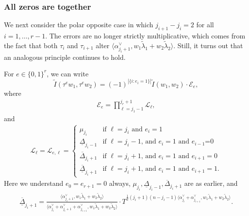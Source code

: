 \documentclass[11pt]{amsart}
\numberwithin{theorem}{section}
\numberwithin{equation}{section}
\theoremstyle{remark}
\theoremstyle{definition}
\begin{document}
\subsubsection{All zeros are together}

We next consider the polar opposite case in which $j_{i+1}-j_i=2$ for all $i=1,\ldots,r-1$. The errors are no longer strictly multiplicative, which comes from the fact that both $\tau_i$ and $\tau_{i+1}$ alter $\langle \alpha^\vee_{j_i+1},w_1\tilde\lambda_1+w_2\tilde\lambda_2\rangle$. Still, it turns out that an analogous principle continues to hold.

For $e \in \{0,1\}^r$, we can write
\begin{equation*}
\tilde I(\tau^ew_1,\tau^ew_2) = (-1)^{|\{i:e_i=1\}|} \tilde I(w_1,w_2) \cdot \mathcal E_e,
\end{equation*}
where
\begin{align*}
\mathcal E_e = \prod_{\ell=j_1-1}^{j_r+1} \mathcal L_\ell,
\end{align*} 
and
\begin{align*}
\mathcal L_\ell = \mathcal L_{e,\ell} = \begin{cases}
\mu_{j_i} & \mbox{if $\ell = j_i$ and $e_i=1$} \\
\underline{\Delta}_{j_i-1} & \mbox{if $\ell = j_i-1$, and $e_i=1$ and $e_{i-1}$=0} \\
\overline {\Delta}_{j_i+1} & \mbox{if $\ell = j_i+1$, and $e_i=1$ and $e_{i+1} = 0$} \\
\underline{\overline{\Delta}}_{j_i+1} & \mbox{if $\ell = j_i+1$, and $e_i=1$ and $e_{i+1} = 1$.}
\end{cases}
\end{align*}
Here we understand $e_0=e_{r+1}=0$ always, $\mu_{j_i}, \underline{\Delta}_{j_i-1},\overline {\Delta}_{j_i+1}$ are as earlier, and
\begin{align*}
\underline{\overline{\Delta}}_{j_i+1} = \frac{\langle \alpha^\vee_{j_i+1}, w_1\tilde\lambda_1+w_2\tilde\lambda_2 \rangle}{\langle \alpha^\vee_{j_i}+\alpha^\vee_{j_i+1}+\alpha^\vee_{j_{i+1}}, w_1\tilde\lambda_1+w_2\tilde\lambda_2 \rangle} \cdot T^{\frac{1}{2}(j_i+1)(n-j_i-1)\langle \alpha^\vee_{j_i}+\alpha^\vee_{j_{i+1}}, w_1\tilde\lambda_1+w_2\tilde\lambda_2 \rangle}.
\end{align*}
\end{document}
